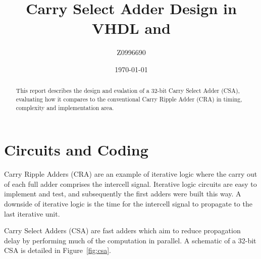 \documentclass[a4paper,11pt]{article}
\title{Carry Select Adder Design in VHDL and \Altera \QuartusII}
\author{Z0996690}
\date{\today}
\begin{document}
\begin{@twocolumnfalse} \centering
    \renewcommand{\abstractname}{\large Abstract}
    \begin{abstract}
        This report describes the design and evalation of a 32-bit Carry Select Adder (CSA), evaluating how it compares to the conventional Carry Ripple Adder (CRA) in timing, complexity and implementation area.
    \end{abstract}
\end{@twocolumnfalse}

\section{Circuits and Coding}

Carry Ripple Adders (CRA) are an example of iterative logic where the carry out of each full adder comprises the intercell signal. Iterative logic circuits are easy to implement and test, and subsequently the first adders were built this way. A downside of iterative logic is the time for the intercell signal to propagate to the last iterative unit.

Carry Select Adders (CSA) are fast adders which aim to reduce propagation delay by performing much of the computation in parallel. A schematic of a 32-bit CSA is detailed in Figure~\ref{fig:csa}.
\end{document}
